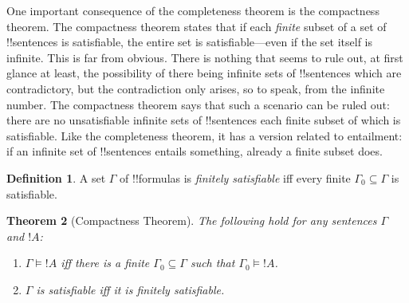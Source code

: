 \documentclass[10pt,a4paper]{article}
\theoremstyle{plain}
\newtheorem{thm}{Theorem}[section]
\theoremstyle{definition}
\newtheorem{defn}[thm]{Definition}
\theoremstyle{remark}
\newcommand*{\ollabel}[1]{\label{#1}}
\providecommand{\Entails}{\mathrel{\models}}
\begin{document}
One important consequence of the completeness theorem is the
compactness theorem.  The compactness theorem states that if each
\emph{finite} subset of a set of !!{sentence}s is satisfiable, the
entire set is satisfiable---even if the set itself is infinite. This
is far from obvious. There is nothing that seems to rule out, at first
glance at least, the possibility of there being infinite sets of
!!{sentence}s which are contradictory, but the contradiction only
arises, so to speak, from the infinite number.  The compactness
theorem says that such a scenario can be ruled out: there are no
unsatisfiable infinite sets of !!{sentence}s each finite subset of
which is satisfiable. Like the completeness theorem, it has a version
related to entailment: if an infinite set of !!{sentence}s entails
something, already a finite subset does.

\begin{defn}
  A set $\Gamma$ of !!{formula}s is \emph{finitely satisfiable} iff every finite $\Gamma_0 \subseteq \Gamma$ is satisfiable.
\end{defn}

\begin{thm}[Compactness Theorem]
\ollabel{thm:compactness}
The following hold for any sentences $\Gamma$ and $!A$:
\begin{enumerate}
  \item $\Gamma \Entails !A$ iff there is a finite $\Gamma_0
    \subseteq \Gamma$ such that $\Gamma_0 \Entails !A$.
  \item $\Gamma$ is satisfiable iff it is finitely
    satisfiable.
\end{enumerate}
\end{thm}
\end{document}
